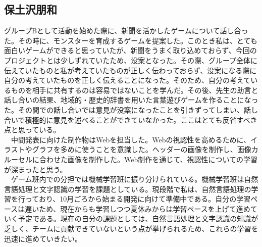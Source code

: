 \subsection{保土沢朋和}
グループBとして活動を始めた際に、新聞を活かしたゲームについて話し合った。その時に、モンスターを育成するゲームを提案した。このとき私は、とても面白いゲームができると思っていたが、新聞をうまく取り込めておらず、今回のプロジェクトとは少しずれていたため、没案となった。その際、グループ全体に伝えていたものと私が考えていたものが正しく伝わっておらず、没案になる際に自分の考えていたものを正しく伝えることになった。そのため、自分の考えているものを相手に共有するのは容易ではないことを学んだ。その後、先生の助言と話し合いの結果、地域的・歴史的辞書を用いた言葉遊びゲームを作ることになった。その間での話し合いでは意見が没案になったことを引きずってしまい、話し合いで積極的に意見を述べることができていなかった。ここはとても反省すべき点と思っている。\\
　中間発表に向けた制作物はWebを担当した。Webの視認性を高めるために、イラストやグラフを多めに使うことを意識した。ヘッダーの画像を制作し、画像カルーセルに合わせた画像を制作した。Web制作を通じて、視認性についての学習が深まったと思う。\\
　ゲーム班内での分担では機械学習班に振り分けられている。機械学習班は自然言語処理と文字認識の学習を課題としている。現段階で私は、自然言語処理の学習を行っており、10月ごろから始まる開発に向けて準備中である。自分の学習ペースは遅いため、現在からも学習しつつ夏休みからは学習ペースを上げて進めていく予定である。現在の自分の課題としては、自然言語処理と文字認識の知識が乏しく、チームに貢献できていないという点が挙げられるため、これらの学習を迅速に進めていきたい。

